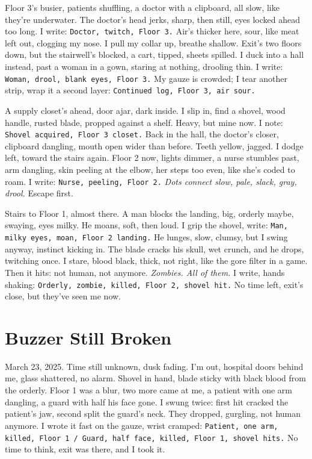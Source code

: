 \documentclass[12pt,oneside]{book}
\newcommand{\note}[1]{\texttt{#1}}
\begin{document}
Floor 3’s busier, patients shuffling, a doctor with a clipboard, all slow, like they’re underwater. The doctor’s head jerks, sharp, then still, eyes locked ahead too long. I write: \note{Doctor, twitch, Floor 3.} Air’s thicker here, sour, like meat left out, clogging my nose. I pull my collar up, breathe shallow. Exit’s two floors down, but the stairwell’s blocked, a cart, tipped, sheets spilled. I duck into a hall instead, past a woman in a gown, staring at nothing, drooling thin. I write: \note{Woman, drool, blank eyes, Floor 3.} My gauze is crowded; I tear another strip, wrap it a second layer: \note{Continued log, Floor 3, air sour.}

A supply closet’s ahead, door ajar, dark inside. I slip in, find a shovel, wood handle, rusted blade, propped against a shelf. Heavy, but mine now. I note: \note{Shovel acquired, Floor 3 closet.} Back in the hall, the doctor’s closer, clipboard dangling, mouth open wider than before. Teeth yellow, jagged. I dodge left, toward the stairs again. Floor 2 now, lights dimmer, a nurse stumbles past, arm dangling, skin peeling at the elbow, her steps too even, like she’s coded to roam. I write: \note{Nurse, peeling, Floor 2.} \textit{Dots connect slow, pale, slack, gray, drool.} Escape first.

Stairs to Floor 1, almost there. A man blocks the landing, big, orderly maybe, swaying, eyes milky. He moans, soft, then loud. I grip the shovel, write: \note{Man, milky eyes, moan, Floor 2 landing.} He lunges, slow, clumsy, but I swing anyway, instinct kicking in. The blade cracks his skull, wet crunch, and he drops, twitching once. I stare, blood black, thick, not right, like the gore filter in a game. Then it hits: not human, not anymore. \textit{Zombies. All of them.} I write, hands shaking: \note{Orderly, zombie, killed, Floor 2, shovel hit.} No time left, exit’s close, but they’ve seen me now.

\chapter{Buzzer Still Broken}

March 23, 2025. Time still unknown, dusk fading. I’m out, hospital doors behind me, glass shattered, no alarm. Shovel in hand, blade sticky with black blood from the orderly. Floor 1 was a blur, two more came at me, a patient with one arm dangling, a guard with half his face gone. I swung twice: first hit cracked the patient’s jaw, second split the guard’s neck. They dropped, gurgling, not human anymore. I wrote it fast on the gauze, wrist cramped: \note{Patient, one arm, killed, Floor 1 / Guard, half face, killed, Floor 1, shovel hits.} No time to think, exit was there, and I took it.
\end{document}
